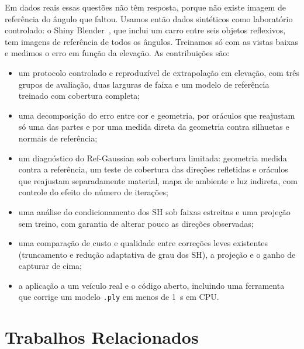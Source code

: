 \documentclass[conference]{IEEEtran}
\begin{document}
Em dados reais essas questões não têm resposta, porque não existe imagem de referência do ângulo que faltou. Usamos então dados sintéticos como laboratório controlado: o Shiny Blender~\cite{verbin2022refnerf}, que inclui um carro entre seis objetos reflexivos, tem imagens de referência de todos os ângulos. Treinamos só com as vistas baixas e medimos o erro em função da elevação. As contribuições são:
\begin{itemize}
\item um protocolo controlado e reproduzível de extrapolação em elevação, com três grupos de avaliação, duas larguras de faixa e um modelo de referência treinado com cobertura completa;
\item uma decomposição do erro entre cor e geometria, por oráculos que reajustam só uma das partes e por uma medida direta da geometria contra silhuetas e normais de referência;
\item um diagnóstico do Ref-Gaussian sob cobertura limitada: geometria medida contra a referência, um teste de cobertura das direções refletidas e oráculos que reajustam separadamente material, mapa de ambiente e luz indireta, com controle do efeito do número de iterações;
\item uma análise do condicionamento dos SH sob faixas estreitas e uma projeção sem treino, com garantia de alterar pouco as direções observadas;
\item uma comparação de custo e qualidade entre correções leves existentes (truncamento e redução adaptativa de grau dos SH), a projeção e o ganho de capturar de cima;
\item a aplicação a um veículo real e o código aberto, incluindo uma ferramenta que corrige um modelo \texttt{.ply} em menos de 1~s em CPU.
\end{itemize}



\section{Trabalhos Relacionados}\label{sec:relacionados}
\end{document}
